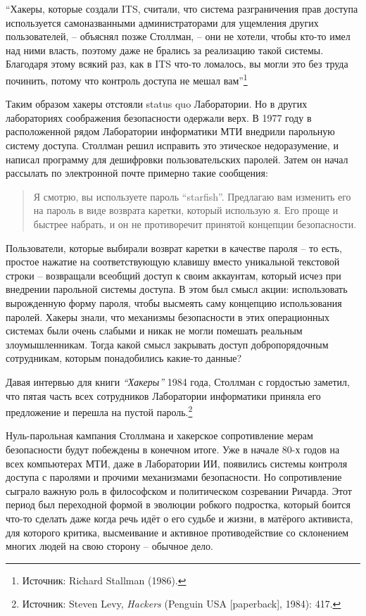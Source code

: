 \enquote{Хакеры, которые создали ITS, считали, что система разграничения прав доступа используется самоназванными администраторами для ущемления других пользователей, -- объяснял позже Столлман, -- они не хотели, чтобы кто-то имел над ними власть, поэтому даже не брались за реализацию такой системы. Благодаря этому всякий раз, как в ITS что-то ломалось, вы могли это без труда починить, потому что контроль доступа не мешал вам}\footnote{Источник: Richard Stallman (1986).}

Таким образом хакеры отстояли status quo Лаборатории. Но в других лабораториях соображения безопасности одержали верх. В 1977 году в расположенной рядом Лаборатории информатики МТИ внедрили парольную систему доступа. Столлман решил исправить это этическое недоразумение, и написал программу для дешифровки пользовательских паролей. Затем он начал рассылать по электронной почте примерно такие сообщения:

\begin{quote}
Я смотрю, вы используете пароль \enquote{starfish}. Предлагаю вам изменить его на пароль в виде возврата каретки, который использую я. Его проще и быстрее набрать, и он не противоречит принятой концепции безопасности.
\end{quote}

Пользователи, которые выбирали возврат каретки в качестве пароля -- то есть, простое нажатие на соответствующую клавишу вместо уникальной текстовой строки -- возвращали всеобщий доступ к своим аккаунтам, который исчез при внедрении парольной системы доступа. В этом был смысл акции: использовать вырожденную форму пароля, чтобы высмеять саму концепцию использования паролей. Хакеры знали, что механизмы безопасности в этих операционных системах были очень слабыми и никак не могли помешать реальным злоумышленникам. Тогда какой смысл закрывать доступ добропорядочным сотрудникам, которым понадобились какие-то данные?

Давая интервью для книги \textit{\enquote{Хакеры}} 1984 года, Столлман с гордостью заметил, что пятая часть всех сотрудников Лаборатории информатики приняла его предложение и перешла на пустой пароль.\footnote{Источник: Steven Levy, \textit{Hackers} (Penguin USA [paperback], 1984): 417.}

Нуль-парольная кампания Столлмана и хакерское сопротивление мерам безопасности будут побеждены в конечном итоге. Уже в начале 80-х годов на всех компьютерах МТИ, даже в Лаборатории ИИ, появились системы контроля доступа с паролями и прочими механизмами безопасности. Но сопротивление сыграло важную роль в философском и политическом созревании Ричарда. Этот период был переходной формой в эволюции робкого подростка, который боится что-то сделать даже когда речь идёт о его судьбе и жизни, в матёрого активиста, для которого критика, высмеивание и активное противодействие со склонением многих людей на свою сторону -- обычное дело.

